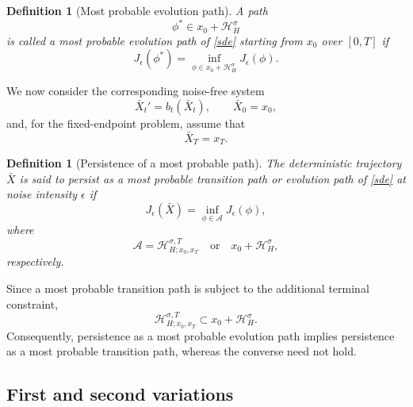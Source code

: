 \documentclass[preprint,12pt]{elsarticle}
\newtheorem{definition}[theorem]{Definition}
\theoremstyle{definition}
\theoremstyle{plain}
\begin{document}
\begin{definition}[Most probable evolution path]
\label{def:most-probable-evolution-path}
A path
\begin{equation*}
    \phi^*
    \in
    x_0+\mathcal H_H^\sigma
\end{equation*}
is called a most probable evolution path of \eqref{sde} starting from
$x_0$ over $[0,T]$ if
\begin{equation*}
    J_\epsilon(\phi^*)
    =
    \inf_{
        \phi\in
        x_0+\mathcal H_H^\sigma
    }
    J_\epsilon(\phi).
\end{equation*}
\end{definition}


We now consider the corresponding noise-free system
\begin{equation}
\label{nnoise}
    \bar X_t'
    =
    b_t(\bar X_t),
    \qquad
    \bar X_0=x_0,
\end{equation}
and, for the fixed-endpoint problem, assume that
\begin{equation*}
    \bar X_T=x_T.
\end{equation*}

\begin{definition}[Persistence of a most probable path]
\label{def:persistence-most-probable-path}
The deterministic trajectory $\bar X$ is said to persist as a most
probable transition path or evolution path of \eqref{sde} at noise
intensity $\epsilon$ if
\begin{equation*}
    J_\epsilon(\bar X)
    =
    \inf_{\phi\in\mathcal A}J_\epsilon(\phi),
\end{equation*}
where
\begin{equation*}
    \mathcal A
    =
    \mathcal H_{H;x_0,x_T}^{\sigma,T}
    \quad\text{or}\quad
    x_0+\mathcal H_H^\sigma,
\end{equation*}
respectively.
\end{definition}

Since a most probable transition path is subject to the additional
terminal constraint,
\begin{equation*}
    \mathcal H_{H;x_0,x_T}^{\sigma,T}
    \subset
    x_0+\mathcal H_H^\sigma.
\end{equation*}
Consequently, persistence as a most probable evolution path implies
persistence as a most probable transition path, whereas the converse
need not hold.
  




\subsection{First and second variations}
\end{document}
